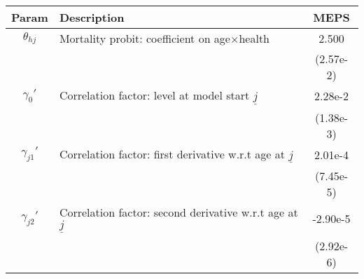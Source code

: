 \begin{table}[ht]\label{MEPSmenCorrParams}
\footnotesize
\begin{center}
\begin{tabular}{clc}
\hline \hline
Param & Description & MEPS \\
\hline
$\theta_{hj}$ & Mortality probit: coefficient on age$\times$health & 2.500 \\
 & & (2.57e-2) \\
$\gamma_{0}'$ & Correlation factor: level at model start $\underline{j}$ & 2.28e-2 \\
 & & (1.38e-3) \\
$\gamma_{j1}'$ & Correlation factor: first derivative w.r.t age at $\underline{j}$ & 2.01e-4 \\
 & & (7.45e-5) \\
$\gamma_{j2}'$ & Correlation factor: second derivative w.r.t age at $\underline{j}$ & -2.90e-5 \\
 & & (2.92e-6) \\
\hline\hline
\end{tabular}
\end{center}
\end{table}
